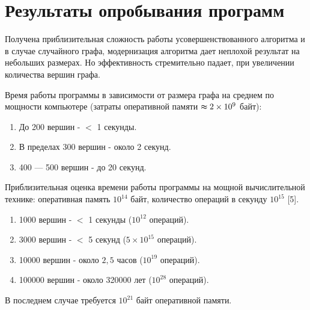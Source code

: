 \section{Результаты опробывания программ}
\label{sec:Results} 
\large 


Получена приблизительная сложность работы усовершенствованного алгоритма и в случае случайного графа, модернизация алгоритма дает неплохой результат на небольших размерах. Но эффективность стремительно падает, при увеличении количества вершин графа.

Время работы программы в зависимости от размера графа на среднем по мощности компьютере (затраты оперативной памяти $\thickapprox 2\times 10^9$ байт):
\begin{enumerate}
\item  До 200 вершин - $<$ 1 секунды.
\item  В пределах 300 вершин - около 2 секунд.
\item  400 — 500 вершин - до 20 секунд.
\end{enumerate}




Приблизительная оценка времени работы программы на мощной вычислительной технике:
оперативная память $10^{14}$ байт,
количество операций в секунду $10^{15}$ [5].
\begin{enumerate}
\item 1000 вершин - $<$ 1 секунды  ($10^{12}$  операций).
\item 3000 вершин - $<$ 5 секунд ($5\times 10^{15}$ операций).
\item 10000 вершин - около $2,5$ часов ($10^{19}$ операций).
\item 100000 вершин - около 320000 лет ($10 ^{28}$ операций).
\end{enumerate}
В последнем случае требуется $10^{21}$ байт оперативной памяти.



